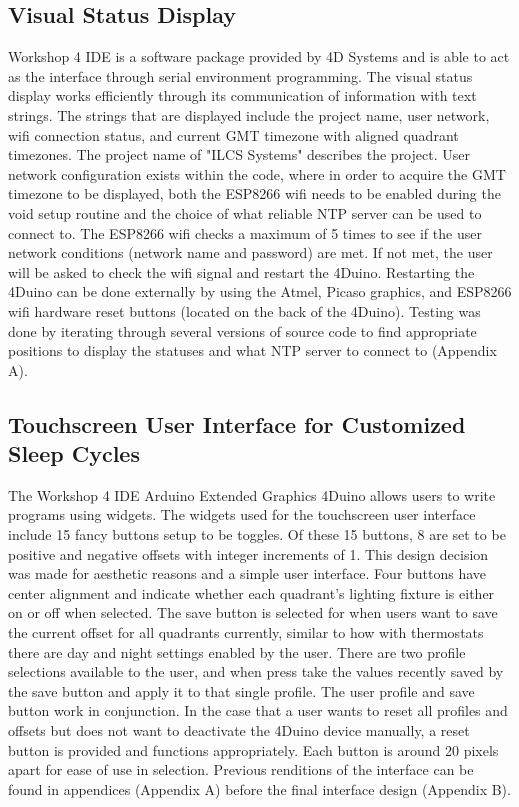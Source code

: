 \documentclass[12pt,a4paper]{report}
\begin{document}
\subsection{Visual Status Display}
Workshop 4 IDE is a software package provided by 4D Systems and is able to act as the interface through serial environment programming. The visual status display works efficiently through its communication of information with text strings. The strings that are displayed include the project name, user network, wifi connection status, and current GMT timezone with aligned quadrant timezones. The project name of "ILCS Systems" describes the project. User network configuration exists within the code, where in order to acquire the GMT timezone to be displayed, both the ESP8266 wifi needs to be enabled during the void setup routine and the choice of what reliable NTP server can be used to connect to. The ESP8266 wifi checks a maximum of 5 times to see if the user network conditions (network name and password) are met. If not met, the user will be asked to check the wifi signal and restart the 4Duino. Restarting the 4Duino can be done externally by using the Atmel, Picaso graphics, and ESP8266 wifi hardware reset buttons (located on the back of the 4Duino). Testing was done by iterating through several versions of source code to find appropriate positions to display the statuses and what NTP server to connect to (Appendix A). \\

\subsection{Touchscreen User Interface for Customized Sleep Cycles}
The Workshop 4 IDE Arduino Extended Graphics 4Duino allows users to write programs using widgets. The widgets used for the touchscreen user interface include 15 fancy buttons setup to be toggles. Of these 15 buttons, 8 are set to be positive and negative offsets with integer increments of 1. This design decision was made for aesthetic reasons and a simple user interface. Four buttons have center alignment and indicate whether each quadrant's lighting fixture is either on or off when selected. The save button is selected for when users want to save the current offset for all quadrants currently, similar to how with thermostats there are day and night settings enabled by the user. There are two profile selections available to the user, and when press take the values recently saved by the save button and apply it to that single profile. The user profile and save button work in conjunction. In the case that a user wants to reset all profiles and offsets but does not want to deactivate the 4Duino device manually, a reset button is provided and functions appropriately. Each button is around 20 pixels apart for ease of use in selection. Previous renditions of the interface can be found in appendices (Appendix A) before the final interface design (Appendix B). \\
\end{document}
